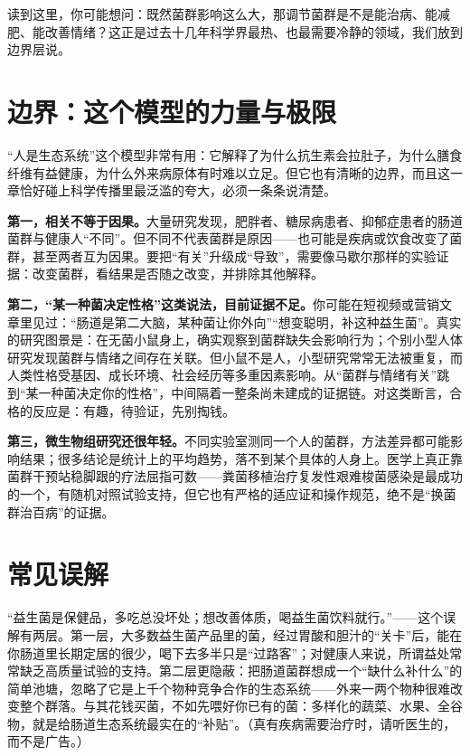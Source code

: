 读到这里，你可能想问：既然菌群影响这么大，那调节菌群是不是能治病、能减肥、能改善情绪？这正是过去十几年科学界最热、也最需要冷静的领域，我们放到边界层说。

\section{边界：这个模型的力量与极限}

“人是生态系统”这个模型非常有用：它解释了为什么抗生素会拉肚子，为什么膳食纤维有益健康，为什么外来病原体有时难以立足。但它也有清晰的边界，而且这一章恰好碰上科学传播里最泛滥的夸大，必须一条条说清楚。

\textbf{第一，相关不等于因果。}大量研究发现，肥胖者、糖尿病患者、抑郁症患者的肠道菌群与健康人“不同”。但不同不代表菌群是原因——也可能是疾病或饮食改变了菌群，甚至两者互为因果。要把“有关”升级成“导致”，需要像马歇尔那样的实验证据：改变菌群，看结果是否随之改变，并排除其他解释。

\textbf{第二，“某一种菌决定性格”这类说法，目前证据不足。}你可能在短视频或营销文章里见过：“肠道是第二大脑，某种菌让你外向”“想变聪明，补这种益生菌”。真实的研究图景是：在无菌小鼠身上，确实观察到菌群缺失会影响行为；个别小型人体研究发现菌群与情绪之间存在关联。但小鼠不是人，小型研究常常无法被重复，而人类性格受基因、成长环境、社会经历等多重因素影响。从“菌群与情绪有关”跳到“某一种菌决定你的性格”，中间隔着一整条尚未建成的证据链。对这类断言，合格的反应是：有趣，待验证，先别掏钱。

\textbf{第三，微生物组研究还很年轻。}不同实验室测同一个人的菌群，方法差异都可能影响结果；很多结论是统计上的平均趋势，落不到某个具体的人身上。医学上真正靠菌群干预站稳脚跟的疗法屈指可数——粪菌移植治疗复发性艰难梭菌感染是最成功的一个，有随机对照试验支持，但它也有严格的适应证和操作规范，绝不是“换菌群治百病”的证据。

\section*{常见误解}

\begin{wuqu}
“益生菌是保健品，多吃总没坏处；想改善体质，喝益生菌饮料就行。”——这个误解有两层。第一层，大多数益生菌产品里的菌，经过胃酸和胆汁的“关卡”后，能在你肠道里长期定居的很少，喝下去多半只是“过路客”；对健康人来说，所谓益处常常缺乏高质量试验的支持。第二层更隐蔽：把肠道菌群想成一个“缺什么补什么”的简单池塘，忽略了它是上千个物种竞争合作的生态系统——外来一两个物种很难改变整个群落。与其花钱买菌，不如先喂好你已有的菌：多样化的蔬菜、水果、全谷物，就是给肠道生态系统最实在的“补贴”。（真有疾病需要治疗时，请听医生的，而不是广告。）
\end{wuqu}

